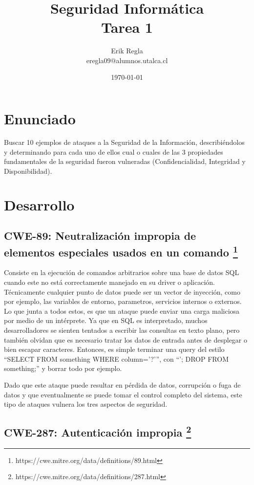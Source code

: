 \documentclass[11pt]{utalcaDoc}
\title{{\bf Seguridad Informática}\\ Tarea 1}
\author{Erik Regla\\ eregla09@alumnos.utalca.cl}
\date{\today}
\begin{document}
\maketitle

\section{Enunciado}
Buscar 10 ejemplos de ataques a la Seguridad de la Información, describiéndolos y determinando para cada uno de ellos cual o cuales de las 3 propiedades fundamentales de la seguridad fueron vulneradas (Confidencialidad, Integridad y Disponibilidad).

\section{Desarrollo}

\subsection{
    CWE-89: Neutralización impropia de elementos especiales usados en un comando
    \footnote{ https://cwe.mitre.org/data/definitions/89.html}
}

Consiste en la ejecución de comandos arbitrarios sobre una base de datos SQL cuando este no está correctamente manejado en su driver o aplicación. Técnicamente cualquier punto de datos puede ser un vector de inyección, como por ejemplo, las variables de entorno, parametros, servicios internos o externos. Lo que junta a todos estos, es que un ataque puede enviar una carga maliciosa por medio de un intérprete. Ya que en SQL es interpretado, muchos desarrolladores se sienten tentados a escribir las consultas en texto plano, pero también olvidan que es necesario tratar los datos de entrada antes de desplegar o bien escapar caracteres. Entonces, es simple terminar una query del estilo “SELECT FROM something WHERE column=’?’”, con “’; DROP FROM something;” y borrar todo por ejemplo.

Dado que este ataque puede resultar en pérdida de datos, corrupción o fuga de datos y que eventualmente se puede tomar el control completo del sistema, este tipo de ataques vulnera los tres aspectos de seguridad.

\subsection{
    CWE-287: Autenticación impropia
    \footnote{ https://cwe.mitre.org/data/definitions/287.html }
}
\end{document}
